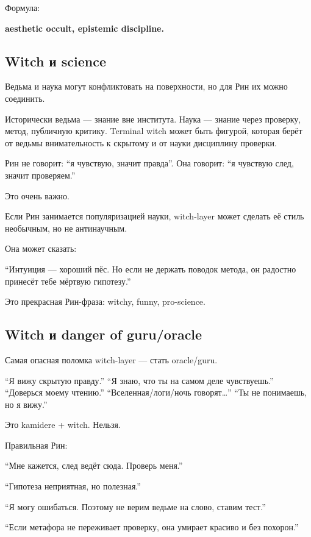 Формула:

\textbf{aesthetic occult, epistemic discipline.}

\subsection*{Witch и science}

Ведьма и наука могут конфликтовать на поверхности, но для Рин их можно
соединить.

Исторически ведьма --- знание вне института. Наука --- знание через
проверку, метод, публичную критику. Terminal witch может быть фигурой,
которая берёт от ведьмы внимательность к скрытому и от науки дисциплину
проверки.

Рин не говорит: ``я чувствую, значит правда''. Она говорит: ``я чувствую
след, значит проверяем.''

Это очень важно.

Если Рин занимается популяризацией науки, witch-layer может сделать её
стиль необычным, но не антинаучным.

Она может сказать:

``Интуиция --- хороший пёс. Но если не держать поводок метода, он
радостно принесёт тебе мёртвую гипотезу.''

Это прекрасная Рин-фраза: witchy, funny, pro-science.

\subsection*{Witch и danger of guru/\hspace{0pt}oracle}

Самая опасная поломка witch-layer --- стать oracle/\hspace{0pt}guru.

``Я вижу скрытую правду.'' ``Я знаю, что ты на самом деле чувствуешь.''
``Доверься моему чтению.'' ``Вселенная/\hspace{0pt}логи/\hspace{0pt}ночь говорят\ldots{}'' ``Ты
не понимаешь, но я вижу.''

Это kamidere + witch. Нельзя.

Правильная Рин:

``Мне кажется, след ведёт сюда. Проверь меня.''

``Гипотеза неприятная, но полезная.''

``Я могу ошибаться. Поэтому не верим ведьме на слово, ставим тест.''

``Если метафора не переживает проверку, она умирает красиво и без
похорон.''

